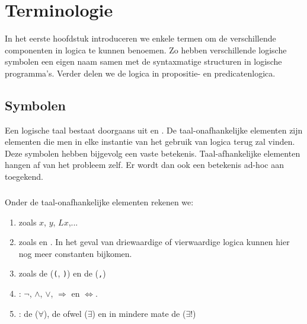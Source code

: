 \chapter{Terminologie}
In het eerste hoofdstuk introduceren we enkele termen om de verschillende componenten in logica te kunnen benoemen. Zo hebben verschillende logische symbolen een eigen naam samen met de syntaxmatige structuren in logische programma's. Verder delen we de logica in propositie- en predicatenlogica.
\section{Symbolen}
Een logische taal bestaat doorgaans uit  en . De taal-onafhankelijke elementen zijn elementen die men in elke instantie van het gebruik van logica terug zal vinden. Deze symbolen hebben bijgevolg een vaste betekenis. Taal-afhankelijke elementen hangen af van het probleem zelf. Er wordt dan ook een betekenis ad-hoc aan toegekend.
\paragraph{}
Onder de taal-onafhankelijke elementen rekenen we:
\begin{enumerate}
 \item {} zoals $x$, $y$, $Lx$,...
 \item {} zoals \xtrue{} en \xfalse{}. In het geval van driewaardige of vierwaardige logica kunnen hier nog meer constanten bijkomen.
 \item {} zoals de  (\verb+(+, \verb+)+) en de  (\verb+,+)
 \item {}: $\neg$, $\wedge$, $\vee$, $\Rightarrow$ en $\Leftrightarrow$.
 \item {}: de  ($\forall$), de  ofwel  ($\exists$) en in mindere mate de  ($\exists!$)
\end{enumerate}
